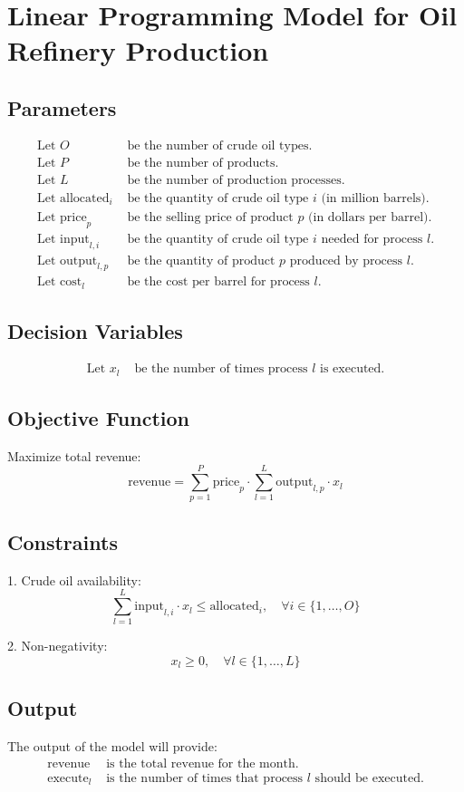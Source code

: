 \documentclass{article}
\begin{document}
\section*{Linear Programming Model for Oil Refinery Production}

\subsection*{Parameters}
\begin{align*}
\text{Let } O & \text{ be the number of crude oil types.} \\
\text{Let } P & \text{ be the number of products.} \\
\text{Let } L & \text{ be the number of production processes.} \\
\text{Let } \text{allocated}_i & \text{ be the quantity of crude oil type } i \text{ (in million barrels).} \\
\text{Let } \text{price}_p & \text{ be the selling price of product } p \text{ (in dollars per barrel).} \\
\text{Let } \text{input}_{l,i} & \text{ be the quantity of crude oil type } i \text{ needed for process } l. \\
\text{Let } \text{output}_{l,p} & \text{ be the quantity of product } p \text{ produced by process } l. \\
\text{Let } \text{cost}_l & \text{ be the cost per barrel for process } l.
\end{align*}

\subsection*{Decision Variables}
\begin{align*}
\text{Let } x_l & \text{ be the number of times process } l \text{ is executed.}
\end{align*}

\subsection*{Objective Function}
Maximize total revenue:
\[
\text{revenue} = \sum_{p=1}^{P} \text{price}_p \cdot \sum_{l=1}^{L} \text{output}_{l,p} \cdot x_l
\]

\subsection*{Constraints}
1. Crude oil availability:
\[
\sum_{l=1}^{L} \text{input}_{l,i} \cdot x_l \leq \text{allocated}_i, \quad \forall i \in \{1, \ldots, O\}
\]

2. Non-negativity:
\[
x_l \geq 0, \quad \forall l \in \{1, \ldots, L\}
\]

\subsection*{Output}
The output of the model will provide:
\begin{align*}
\text{revenue} & \text{ is the total revenue for the month.} \\
\text{execute}_l & \text{ is the number of times that process } l \text{ should be executed.}
\end{align*}
\end{document}
